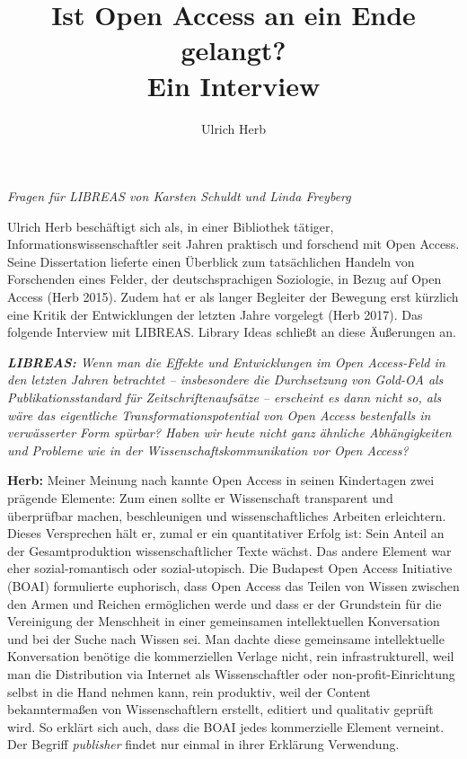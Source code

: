 \documentclass[a4paper,
fontsize=11pt,
oneside,
numbers=noperiodatend,
parskip=half-,
bibliography=totoc,
final
]{scrartcl}
\title{\LARGE{Ist Open Access an ein Ende gelangt? \\ Ein Interview}} %
\author{Ulrich Herb} %
\date{}
\begin{document}
\maketitle
\thispagestyle{fancyplain} 


\emph{Fragen für LIBREAS von Karsten Schuldt und Linda Freyberg}

Ulrich Herb beschäftigt sich als, in einer Bibliothek tätiger,
Informationswissenschaftler seit Jahren praktisch und forschend mit Open
Access. Seine Dissertation lieferte einen Überblick zum tatsächlichen
Handeln von Forschenden eines Felder, der deutschsprachigen Soziologie,
in Bezug auf Open Access (Herb 2015). Zudem hat er als langer Begleiter
der Bewegung erst kürzlich eine Kritik der Entwicklungen der letzten
Jahre vorgelegt (Herb 2017). Das folgende Interview mit LIBREAS. Library
Ideas schließt an diese Äußerungen an.

\emph{\textbf{LIBREAS:} Wenn man die Effekte und Entwicklungen im Open
Access-Feld in den letzten Jahren betrachtet -- insbesondere die
Durchsetzung von Gold-OA als Publikationsstandard für
Zeitschriftenaufsätze -- erscheint es dann nicht so, als wäre das
eigentliche Transformationspotential von Open Access bestenfalls in
verwässerter Form spürbar? Haben wir heute nicht ganz ähnliche
Abhängigkeiten und Probleme wie in der Wissenschaftskommunikation vor
Open Access?}

\textbf{Herb:} Meiner Meinung nach kannte Open Access in seinen
Kindertagen zwei prägende Elemente: Zum einen sollte er Wissenschaft
transparent und überprüfbar machen, beschleunigen und wissenschaftliches
Arbeiten erleichtern. Dieses Versprechen hält er, zumal er ein
quantitativer Erfolg ist: Sein Anteil an der Gesamtproduktion
wissenschaftlicher Texte wächst. Das andere Element war eher
sozial-romantisch oder sozial-utopisch. Die Budapest Open Access
Initiative (BOAI) formulierte euphorisch, dass Open Access das Teilen
von Wissen zwischen den Armen und Reichen ermöglichen werde und dass er
der Grundstein für die Vereinigung der Menschheit in einer gemeinsamen
intellektuellen Konversation und bei der Suche nach Wissen sei. Man
dachte diese gemeinsame intellektuelle Konversation benötige die
kommerziellen Verlage nicht, rein infrastrukturell, weil man die
Distribution via Internet als Wissenschaftler oder
non-profit-Einrichtung selbst in die Hand nehmen kann, rein produktiv,
weil der Content bekanntermaßen von Wissenschaftlern erstellt, editiert
und qualitativ geprüft wird. So erklärt sich auch, dass die BOAI jedes
kommerzielle Element verneint. Der Begriff \emph{publisher} findet nur
einmal in ihrer Erklärung Verwendung.
\end{document}
